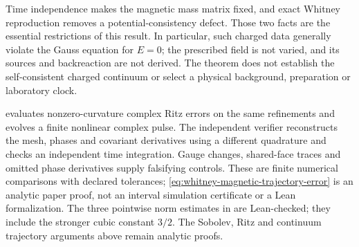 Time independence makes the magnetic mass matrix fixed, and exact Whitney
reproduction removes a potential-consistency defect. Those two facts are
the essential restrictions of this result. In particular, such charged
data generally violate the Gauss equation for \(E=0\); the prescribed
field is not varied, and its sources and backreaction are not derived.
The theorem does not establish the self-consistent charged continuum or
select a physical background, preparation or laboratory clock.

 evaluates
nonzero-curvature complex Ritz errors on the same refinements and evolves
a finite nonlinear complex pulse. The independent verifier reconstructs
the mesh, phases and covariant derivatives using a different quadrature
and checks an independent time integration. Gauge changes, shared-face
traces and omitted phase derivatives supply falsifying controls.
These are finite numerical comparisons with declared tolerances;
\eqref{eq:whitney-magnetic-trajectory-error} is an analytic paper proof,
not an interval simulation certificate or a Lean formalization.
The three pointwise norm estimates in
 are Lean-checked; they
include the stronger cubic constant \(3/2\). The Sobolev, Ritz and
continuum trajectory arguments above remain analytic proofs.
